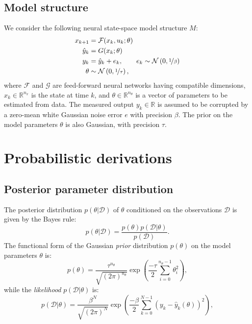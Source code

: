 \documentclass{ifacconf}
\newcommand{\R}{\mathbb{R}}
\newcommand{\nx}{{n_x}}
\newcommand{\nsamp}{N}
\newcommand{\npar}{{n_\theta}}
\newcommand{\F}{\mathcal{F}} %
\newcommand{\G}{\mathcal{G}} %
\newcommand{\N}{\mathcal{N}} %
\newcommand{\mean}[1]{\hat{#1}}
\newcommand{\D}{\mathcal{D}} %
\begin{document}
\subsection{Model structure}
We consider the following neural state-space model structure $M$: 
 \begin{subequations}
  \label{eq:ss_model}
 \begin{align}
  x_{k+1} &= \F(x_k, u_k; \theta) \label{eq:ss_model_a} \\
  \mean{y}_{k} &= G(x_k; \theta) \\
  y_{k} &=  \mean{y}_{k} + e_k, \qquad e_k \sim \N\left(0, \nicefrac{1}{\beta}\right) \label{eq:ss_model_b} \\
  \theta &\sim \N\left(0, \nicefrac{1}{\tau}\right),
  \end{align}
\end{subequations}
where $\F$ and $\G$ are feed-forward neural networks having compatible dimensions, $x_k \in \mathbb{R}^{\nx}$ is the state at time $k$, and $\theta \in \mathbb{R}^{n_\theta}$ is a vector of parameters to be estimated from data. The measured output $y_{k} \in \R$ is assumed to be corrupted by a zero-mean white Gaussian noise error $e$ with {precision} $\beta$. The prior on the model parameters $\theta$ is also Gaussian, with precision $\tau$.


\section{Probabilistic derivations}
\subsection{Posterior parameter distribution}
The  posterior distribution $p(\theta |  \D)$ of $\theta$ conditioned on the observations $\D$ is given by the Bayes rule:
\begin{equation}
\label{eq:bayes_rule}
p(\theta |  \D) = \frac{p(\theta) p(\D|\theta)}{p(\D)}.
\end{equation}
The functional form of the Gaussian \emph{prior} distribution $p(\theta)$ on the model parameters $\theta$ is:
\begin{equation}
\label{eq:theta_prior}
p(\theta) = \frac{\tau^\npar}{\sqrt{(2\pi)^{\npar} }} \exp\left(\frac{-\tau}{2} \sum_{i=0}^{\npar-1} \theta_i^2\right),
\end{equation}
while the \emph{likelihood} $p(\mathcal{D}|\theta)$ is:
\begin{equation}
\label{eq:likelihood}
p(\mathcal{D}|\theta) = \frac{\beta^\nsamp}{\sqrt{(2\pi)^{\nsamp} }} \exp\left(\frac{-\beta}{2}\sum_{k=0}^{\nsamp-1}{(y_k - \mean{y}_k(\theta))^2}\right),
\end{equation}
\end{document}
